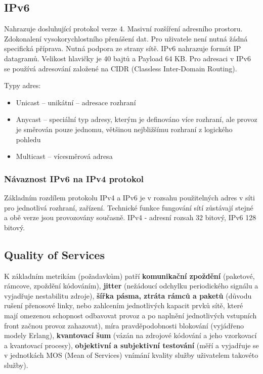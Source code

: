 \subsection{IPv6}
Nahrazuje dosluhující protokol verze 4. Masivní rozšíření adresního prostoru. Zdokonalení vysokorychlostního přenášení dat. Pro uživatele není nutná žádná specifická příprava. Nutná podpora ze strany sítě. IPv6 nahrazuje formát IP datagramů. Velikost hlavičky je 40 bajtů a Payload 64 KB. Pro adresaci v IPv6 se používá adresování založené na CIDR (Classless Inter-Domain Routing). 

Typy adres:
\begin{itemize}
    \item Unicast – unikátní – adresace rozhraní
    \item Anycast – speciální typ adresy, kterým je definováno více rozhraní, ale provoz je směrován pouze jednomu, většinou nejbližšímu rozhraní z logického pohledu
    \item Multicast – vícesměrová adresa
\end{itemize}

\subsubsection{Návaznost IPv6 na IPv4 protokol}
Základním rozdílem protokolu IPv4 a IPv6 je v rozsahu použitelných adres v síti pro jednotlivá rozhraní, zařízení. Technické funkce fungování sítí zůstávají stejné a obě verze jsou provozovány současně. IPv4 - adresní rozsah 32 bitový, IPv6 128 bitový.

\subsection{Quality of Services}
K základním metrikám (požadavkům) patří \textbf{komunikační zpoždění} (paketové, rámcove, zpoždění kódováním), \textbf{jitter} (nežádoucí odchylku periodického signálu a vyjadřuje nestabilitu zdroje), \textbf{šířka pásma, ztráta rámců a paketů} (důvodu rušení přenosové linky, nebo zahlcením jednotlivých kapacit prvků sítě, které mají omezenou schopnost odbavovat provoz a po naplnění jednotlivých vstupních front začnou provoz zahazovat), míra pravděpodobnosti blokování (vyjádřeno modely Erlang), \textbf{kvantovací šum} (vázán na zdrojové kódování a jeho vzorkovací
a kvantovací procesy), \textbf{objektivní a subjektivní testování} (měří a vyjadřuje se v jednotkách MOS (Mean of Services) vnímání kvality služby uživatelem takovéto služby).

